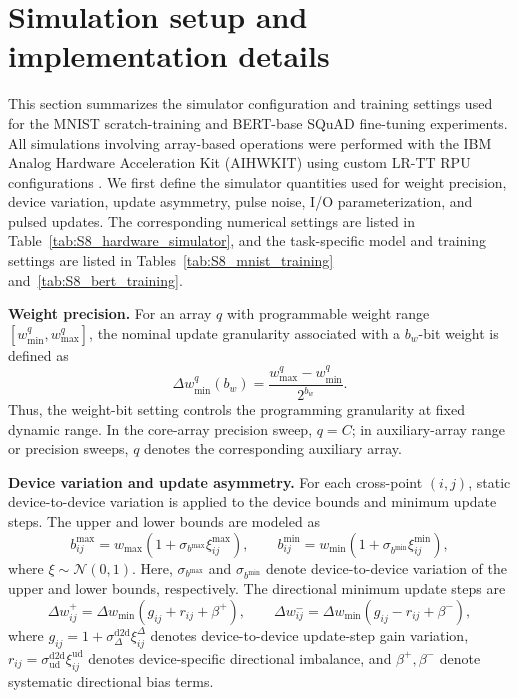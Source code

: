 \documentclass[AMA,LATO1COL]{WileyNJDv5}
\newcommand{\SIEndSection}{\FloatBarrier\clearpage}
\begin{document}
\SIEndSection

\clearpage
\section{Simulation setup and implementation details}
\label{sec:S8}

\noindent
This section summarizes the simulator configuration and training settings used for the MNIST scratch-training and BERT-base SQuAD fine-tuning experiments. All simulations involving array-based operations were performed with the IBM Analog Hardware Acceleration Kit (AIHWKIT) using custom LR-TT RPU configurations \cite{rasch2021aihwkit,legallo2023aihwkit}. We first define the simulator quantities used for weight precision, device variation, update asymmetry, pulse noise, I/O parameterization, and pulsed updates. The corresponding numerical settings are listed in Table~\ref{tab:S8_hardware_simulator}, and the task-specific model and training settings are listed in Tables~\ref{tab:S8_mnist_training} and~\ref{tab:S8_bert_training}.

\noindent\textbf{Weight precision.}
For an array \(q\) with programmable weight range \([w_{\min}^{q},w_{\max}^{q}]\), the nominal update granularity associated with a \(b_w\)-bit weight is defined as
\begin{equation}
\Delta w_{\min}^{q}(b_w)
=
\frac{w_{\max}^{q}-w_{\min}^{q}}{2^{b_w}} .
\label{eq:S8_weight_bit}
\end{equation}
Thus, the weight-bit setting controls the programming granularity at fixed dynamic range. In the core-array precision sweep, \(q=C\); in auxiliary-array range or precision sweeps, \(q\) denotes the corresponding auxiliary array.

\noindent\textbf{Device variation and update asymmetry.}
For each cross-point \((i,j)\), static device-to-device variation is applied to the device bounds and minimum update steps. The upper and lower bounds are modeled as
\begin{equation}
b^{\max}_{ij}=w_{\max}\left(1+\sigma_{b^{\max}}\xi_{ij}^{\max}\right),
\qquad
b^{\min}_{ij}=w_{\min}\left(1+\sigma_{b^{\min}}\xi_{ij}^{\min}\right),
\label{eq:S8_bound_dtod}
\end{equation}
where \(\xi\sim\mathcal{N}(0,1)\). Here, \(\sigma_{b^{\max}}\) and \(\sigma_{b^{\min}}\) denote device-to-device variation of the upper and lower bounds, respectively. The directional minimum update steps are
\begin{equation}
\Delta w^{+}_{ij}
=
\Delta w_{\min}
\left(g_{ij}+r_{ij}+\beta^{+}\right),
\qquad
\Delta w^{-}_{ij}
=
\Delta w_{\min}
\left(g_{ij}-r_{ij}+\beta^{-}\right),
\label{eq:S8_directional_step}
\end{equation}
where \(g_{ij}=1+\sigma_{\Delta}^{\mathrm{d2d}}\xi_{ij}^{\Delta}\) denotes device-to-device update-step gain variation, \(r_{ij}=\sigma_{\mathrm{ud}}^{\mathrm{d2d}}\xi_{ij}^{\mathrm{ud}}\) denotes device-specific directional imbalance, and \(\beta^{+},\beta^{-}\) denote systematic directional bias terms.
\end{document}
